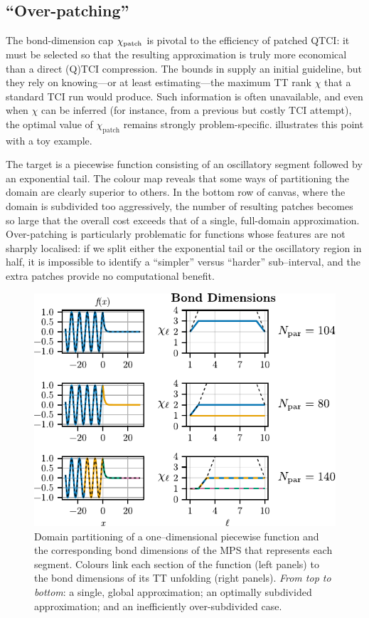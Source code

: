 \subsection{``Over-patching''}
The bond-dimension cap \(\chi_{\text{patch}}\) is pivotal to the efficiency of patched QTCI: it must be selected so that the resulting approximation is truly more economical than a direct (Q)TCI compression. The bounds in  supply an initial guideline, but they rely on knowing—or at least estimating—the maximum TT rank \(\chi\) that a standard TCI run would produce.  Such information is often unavailable, and even when \(\chi\) can be inferred (for instance, from a previous but costly TCI attempt), the optimal value of \(\chi_{\text{patch}}\) remains strongly problem-specific.
 illustrates this point with a toy example. 

The target is a piecewise function consisting of an oscillatory segment followed by an exponential tail. The colour map reveals that some ways of partitioning the domain are clearly superior to others. In the bottom row of canvas, where the domain is subdivided too aggressively, the number of resulting patches becomes so large that the overall cost exceeds that of a single, full-domain approximation. Over-patching is particularly problematic for functions whose features are not sharply localised: if we split either the exponential tail or the oscillatory region in half, it is impossible to identify a “simpler” versus “harder” sub–interval, and the extra patches provide no computational benefit. 


\begin{figure}[ht!]
	\centering 
	\includegraphics{figures/1DOverpatchingBonddim.pdf}
	\caption{Domain partitioning of a one–dimensional piecewise function and the corresponding bond dimensions of the MPS that represents each segment\protect\footnotemark . Colours link each section of the function (left panels) to the bond dimensions of its TT unfolding (right panels).  \textit{From top to bottom}: a single, global approximation; an optimally subdivided approximation; and an inefficiently over-subdivided case.}
	\label{fig:1DOverpatchingBonddim}
\end{figure}

